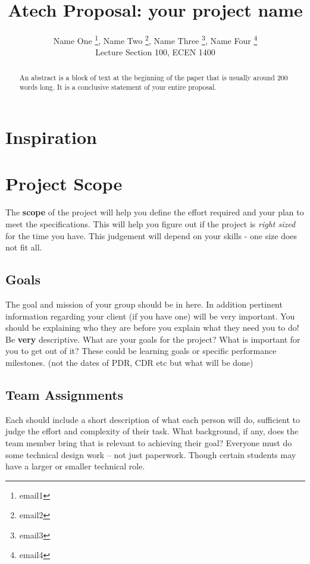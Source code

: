 \documentclass[12pt]{article}
\title{Atech Proposal: your project name}
\author{
  Name One \footnote{email1},
  Name Two \footnote{email2},
  Name Three \footnote{email3},
  Name Four \footnote{email4}\\
    {\normalsize 
   Lecture Section 100, ECEN 1400}\\
 }
\begin{document}
\maketitle

\begin{abstract}
An abstract is a block of text at the beginning of the paper that is usually around 200 words long. It is a conclusive statement of your entire proposal. 
\end{abstract}


\newpage

\tableofcontents

\newpage

\section{Inspiration}
\newpage

\section{Project Scope}
The \textbf{scope} of the project will help you define the effort required and your plan to meet the specifications. This will help you figure out if the project is \textit{right sized} for the time you have. This judgement will depend on your skills - one size does not fit all.
\subsection{Goals}
The goal and mission of your group should be in here. In addition pertinent information regarding your client (if you have one) will be very important. You should be explaining who they are before you explain what they need you to do! Be \textbf{very} descriptive.  What are your goals for the project? What is important for you to get out of it? These could be learning goals or specific performance milestones. (not the dates of PDR, CDR etc but what will be done) 

\subsection{Team Assignments}
Each should include a short description of what each person will do, sufficient to judge the effort and complexity of their task. What background, if any, does the team member bring that is relevant to achieving their goal? Everyone must do some technical design work – not just paperwork. Though certain students may have a larger or smaller technical role.
\end{document}

